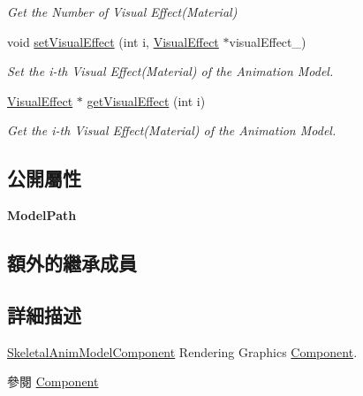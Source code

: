 \begin{DoxyCompactItemize}
\begin{DoxyCompactList}\small\item\em Get the Number of Visual Effect(\+Material) \end{DoxyCompactList}\item 
void \hyperlink{class_magnum_1_1_skeletal_anim_model_component_a5d7aea6f470653d4936a7a2feff6a033}{set\+Visual\+Effect} (int i, \hyperlink{class_magnum_1_1_visual_effect}{Visual\+Effect} $\ast$visual\+Effect\+\_\+)
\begin{DoxyCompactList}\small\item\em Set the i-\/th Visual Effect(\+Material) of the Animation Model. \end{DoxyCompactList}\item 
\hyperlink{class_magnum_1_1_visual_effect}{Visual\+Effect} $\ast$ \hyperlink{class_magnum_1_1_skeletal_anim_model_component_a9ef9c3a84c2b8487326eb0976c7a7795}{get\+Visual\+Effect} (int i)
\begin{DoxyCompactList}\small\item\em Get the i-\/th Visual Effect(\+Material) of the Animation Model. \end{DoxyCompactList}\end{DoxyCompactItemize}
\subsection*{公開屬性}
\begin{DoxyCompactItemize}
\item 
{\bfseries Model\+Path}\hypertarget{class_magnum_1_1_skeletal_anim_model_component_a9c8aa7ee81414c7c418753b5c837fd11}{}\label{class_magnum_1_1_skeletal_anim_model_component_a9c8aa7ee81414c7c418753b5c837fd11}

\end{DoxyCompactItemize}
\subsection*{額外的繼承成員}


\subsection{詳細描述}
\hyperlink{class_magnum_1_1_skeletal_anim_model_component}{Skeletal\+Anim\+Model\+Component} Rendering Graphics \hyperlink{class_magnum_1_1_component}{Component}. 

\begin{DoxySeeAlso}{參閱}
\hyperlink{class_magnum_1_1_component}{Component} 
\end{DoxySeeAlso}


